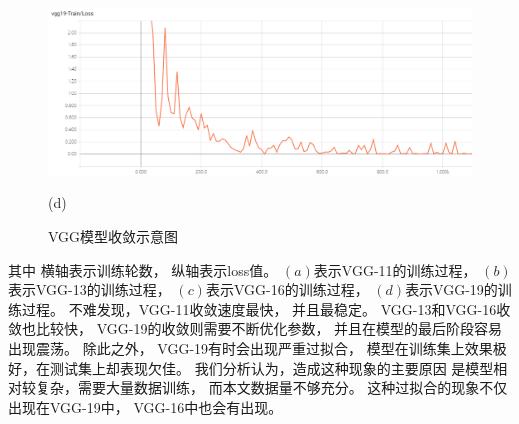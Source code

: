\begin{figure}[htbp]
\begin{minipage}{0.8\linewidth}
\centerline{\includegraphics[width=1.0\linewidth]{figures/vgg19.png}}
\centerline{(d)}
\end{minipage}

\caption{VGG模型收敛示意图}
\label{fig:vggshoulian}
\end{figure}
其中
横轴表示训练轮数，
纵轴表示loss值。
$(a)$表示VGG-11的训练过程，
$(b)$表示VGG-13的训练过程，
$(c)$表示VGG-16的训练过程，
$(d)$表示VGG-19的训练过程。
不难发现，VGG-11收敛速度最快，
并且最稳定。
VGG-13和VGG-16收敛也比较快，
VGG-19的收敛则需要不断优化参数，
并且在模型的最后阶段容易出现震荡。
除此之外，
VGG-19有时会出现严重过拟合，
模型在训练集上效果极好，在测试集上却表现欠佳。
我们分析认为，造成这种现象的主要原因
是模型相对较复杂，需要大量数据训练，
而本文数据量不够充分。
这种过拟合的现象不仅出现在VGG-19中，
VGG-16中也会有出现。

